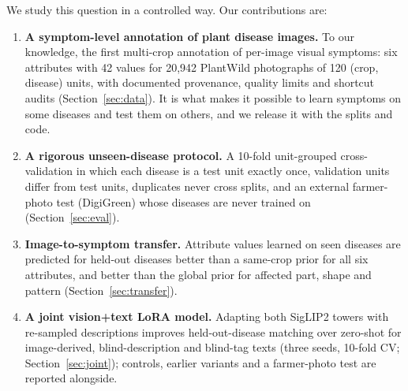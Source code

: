 \documentclass[11pt]{article}
\begin{document}
We study this question in a controlled way. Our contributions are:
\begin{enumerate}
\item \textbf{A symptom-level annotation of plant disease images.} To our knowledge, the first multi-crop annotation of per-image visual symptoms: six attributes with 42 values for 20{,}942 PlantWild photographs of 120 (crop, disease) units, with documented provenance, quality limits and shortcut audits (Section~\ref{sec:data}). It is what makes it possible to learn symptoms on some diseases and test them on others, and we release it with the splits and code.
\item \textbf{A rigorous unseen-disease protocol.} A 10-fold unit-grouped cross-validation in which each disease is a test unit exactly once, validation units differ from test units, duplicates never cross splits, and an external farmer-photo test (DigiGreen) whose diseases are never trained on (Section~\ref{sec:eval}).
\item \textbf{Image-to-symptom transfer.} Attribute values learned on seen diseases are predicted for held-out diseases better than a same-crop prior for all six attributes, and better than the global prior for affected part, shape and pattern (Section~\ref{sec:transfer}).
\item \textbf{A joint vision+text LoRA model.} Adapting both SigLIP2 towers with re-sampled descriptions improves held-out-disease matching over zero-shot for image-derived, blind-description and blind-tag texts (three seeds, 10-fold CV; Section~\ref{sec:joint}); controls, earlier variants and a farmer-photo test are reported alongside.
\end{enumerate}
\end{document}
